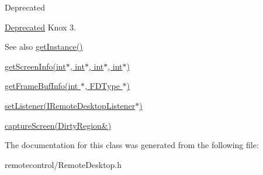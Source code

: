 \begin{DoxyRefDesc}{\-Deprecated}
\item[\hyperlink{deprecated__deprecated000033}{\-Deprecated}]\-Knox 3.\end{DoxyRefDesc}


\begin{DoxySeeAlso}{\-See also}
\hyperlink{classknoxremotedesktop_1_1IRemoteDesktop_a86eefbec946d605470af069999763f74}{get\-Instance()}

\hyperlink{classknoxremotedesktop_1_1IRemoteDesktop_ae9a1e6863bfc2affad4462bc0a29914a}{get\-Screen\-Info(int$\ast$, int$\ast$, int$\ast$, int$\ast$)}

\hyperlink{classknoxremotedesktop_1_1IRemoteDesktop_a57d5432823adfd7cfb72441469ccc98e}{get\-Frame\-Buf\-Info(int $\ast$, F\-D\-Type $\ast$)}

\hyperlink{classknoxremotedesktop_1_1IRemoteDesktop_af22e75002f52d837cfc9d9589647ddb9}{set\-Listener(\-I\-Remote\-Desktop\-Listener$\ast$)}

\hyperlink{classknoxremotedesktop_1_1IRemoteDesktop_a0ab5a0cf162a91c5e69abeed90f8ba09}{capture\-Screen(\-Dirty\-Region\&)} 
\end{DoxySeeAlso}


\-The documentation for this class was generated from the following file\-:\begin{DoxyCompactItemize}
\item 
remotecontrol/\-Remote\-Desktop.\-h\end{DoxyCompactItemize}
